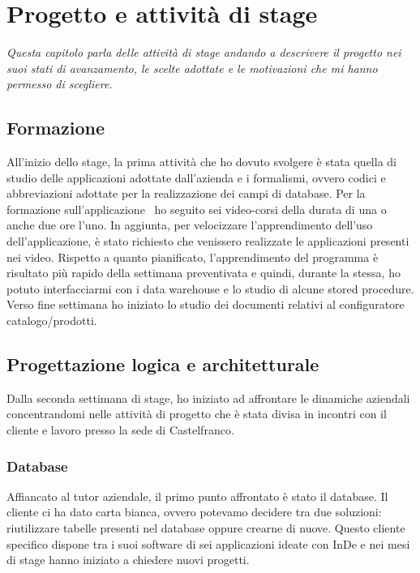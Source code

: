 \chapter{Progetto e attività di stage}
\textit{Questa capitolo parla delle attività di stage andando a descrivere il progetto nei suoi stati di avanzamento, le scelte adottate e le motivazioni che mi hanno permesso di scegliere.}

\section{Formazione}
All'inizio dello stage, la prima attività che ho dovuto svolgere è stata quella di studio delle applicazioni adottate dall'azienda e i formalismi, ovvero codici e abbreviazioni adottate per la realizzazione dei campi di database. 
Per la formazione sull'applicazione \inde\, ho seguito sei video-corsi della durata di una o anche due ore l'uno. In aggiunta, per velocizzare l'apprendimento dell'uso dell'applicazione, è stato richiesto che venissero realizzate le applicazioni presenti nei video.
Rispetto a quanto pianificato, l'apprendimento del programma è risultato più rapido della settimana preventivata e quindi, durante la stessa, ho potuto interfacciarmi con i data warehouse e lo studio di alcune stored procedure. 
Verso fine settimana ho iniziato lo studio dei documenti relativi al configuratore catalogo/prodotti.


\section{Progettazione logica e architetturale}
Dalla seconda settimana di stage, ho iniziato ad affrontare le dinamiche aziendali concentrandomi nelle attività di progetto che è stata divisa in incontri con il cliente e lavoro presso la sede di Castelfranco.

\subsection{Database}
Affiancato al tutor aziendale, il primo punto affrontato è stato il database. Il cliente ci ha dato carta bianca, ovvero potevamo decidere tra due soluzioni: riutilizzare tabelle presenti nel database oppure crearne di nuove. Questo cliente specifico dispone tra i suoi software di sei applicazioni ideate con InDe e nei mesi di stage hanno iniziato a chiedere nuovi progetti.

